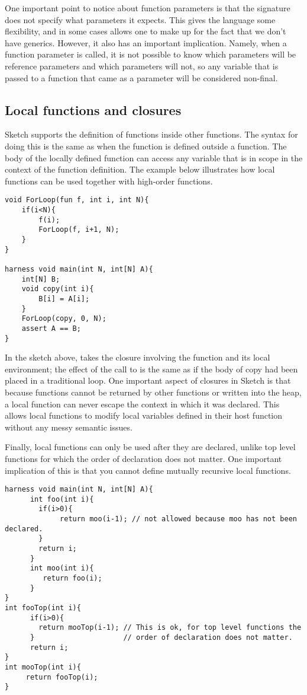 One important point to notice about function parameters is that the signature does not specify what parameters it expects. This gives the language some flexibility, and in some cases allows one to make up for the fact that we don't have generics. However, it also has an important implication. Namely, when a function parameter is called, it is not possible to know which parameters will be reference parameters and which parameters will not, so any variable that is passed to a function that came as a parameter will be considered non-final.

\subsection{Local functions and closures}
Sketch supports the definition of functions inside other functions. The syntax for doing this is the same as when the function is defined outside a function. The body of the locally defined function can access any variable that is in scope in the context of the function definition. The example below illustrates how local functions can be used together with high-order functions.

\begin{lstlisting}
void ForLoop(fun f, int i, int N){
	if(i<N){
		f(i);
		ForLoop(f, i+1, N);
	}
}

harness void main(int N, int[N] A){
	int[N] B;
	void copy(int i){
		B[i] = A[i];
	}
	ForLoop(copy, 0, N);
	assert A == B;
}
\end{lstlisting}

In the sketch above,  takes the closure involving the function  and its local environment; the effect of the call to  is the same as if the body of copy had been placed in a traditional  loop.
One important aspect of closures in Sketch is that because functions cannot be returned by other functions or written into the heap, a local function can never escape the context in which it was declared. This allows local functions to modify local variables defined in their host function without any messy semantic issues.

Finally, local functions can only be used after they are declared, unlike top level functions for which the order of declaration does not matter. One important implication of this is that you cannot define mutually recursive local functions.

\begin{lstlisting}
harness void main(int N, int[N] A){
      int foo(int i){
        if(i>0){
             return moo(i-1); // not allowed because moo has not been declared.
        }
        return i;
      }
      int moo(int i){
         return foo(i);
      }
}
int fooTop(int i){
      if(i>0){
        return mooTop(i-1); // This is ok, for top level functions the
      }                     // order of declaration does not matter.
      return i;
}
int mooTop(int i){
     return fooTop(i);
}
\end{lstlisting}


